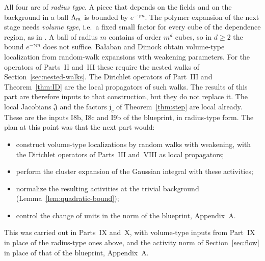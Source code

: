 All four are of \emph{radius type}. A piece that depends on the fields and on the background in a ball $\Lambda_m$ is bounded by $e^{-\gamma m}$. The polymer expansion of the next stage needs \emph{volume type}, i.e.\ a fixed small factor for every cube of the dependence region, as in \cite[(116)--(122)]{DimockI}. A ball of radius $m$ contains of order $m^d$ cubes, so in $d\ge2$ the bound $e^{-\gamma m}$ does not suffice. Ba\l aban and Dimock obtain volume-type localization from random-walk expansions with weakening parameters. For the operators of Parts~II and~III these require the nested walks of Section~\ref{sec:nested-walks}. The Dirichlet operators of Part~III and Theorem~\ref{thm:ID} are the local propagators of such walks. The results of this part are therefore inputs to that construction, but they do not replace it.
The local Jacobians $\mathfrak J$ and the factors $\mathfrak j_c$ of Theorem~\ref{thm:step} are local already. These are the inputs \textsf{I8b}, \textsf{I8c} and \textsf{I9b} of the blueprint, in radius-type form. The plan at this point was that the next part would:
\begin{itemize}
\item construct volume-type localizations by random walks with weakening, with the Dirichlet operators of Parts~III and~VIII as local propagators;
\item perform the cluster expansion of the Gaussian integral with these activities;
\item normalize the resulting activities at the trivial background (Lemma~\ref{lem:quadratic-bound});
\item control the change of units in the norm of the blueprint, Appendix~A.
\end{itemize}
This was carried out in Parts~IX and~X, with volume-type inputs from Part~IX in place of the radius-type ones above, and the activity norm of Section~\ref{sec:flow} in place of that of the blueprint, Appendix~A.
